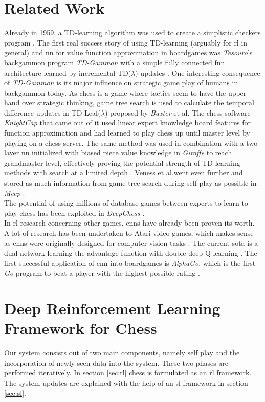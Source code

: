 \documentclass[twocolumn]{phdsymp} %
\begin{document}
\section{Related Work}
\label{sec:relwork}
Already in 1959, a TD-learning algorithm was used to create a simplistic checkers program \cite{samuel}. The first real success story of using TD-learning (arguably for \gls{rl} in general) and \Gls{nn} for value function approximation in boardgames was \textit{Tesouro}'s backgammon program \textit{TD-Gammon} with a simple fully connected \gls{fnn} architecture learned by incremental TD($\lambda$) updates \cite{tesauro}. One interesting consequence of \textit{TD-Gammon} is its major influence on strategic game play of humans in backgammon today. As chess is a game where tactics seem to have the upper hand over strategic thinking, game tree search is used to calculate the temporal difference updates in TD-Leaf($\lambda$) proposed by \textit{Baxter} et al. The chess software \textit{KnightCap} that came out of it used linear expert knowledge board features for function approximation and had learned to play chess up until master level by playing on a chess server. The same method was used in combination with a two layer \gls{nn} initialized with biased piece value knowledge in \textit{Giraffe} to reach grandmaster level, effectively proving the potential strength of TD-learning methods with search at a limited depth \cite{giraffe}.  Veness et al.went even further and stored as much information from game tree search during self play as possible in \textit{Meep} \cite{meep}.\\
The potential of using millions of database games between experts to learn to play chess has been exploited in \textit{DeepChess} \cite{deepchess}.\\

In \gls{rl} research concerning other games, \glspl{cnn} have already been proven its worth. A lot of research has been undertaken to Atari video games, which makes sense as \glspl{cnn} were originally designed for computer vision tasks \cite{atari}. The current \gls{sota} is a dual network learning the advantage function with double deep Q-learning \cite{dddqn}. The first successful application of \Gls{cnn} into boardgames is \textit{AlphaGo}, which is the first \textit{Go} program to beat a player with the highest possible rating \cite{alphago}.   

\section{Deep Reinforcement Learning Framework for Chess}
\label{sec:drl}
Our system consists out of two main components, namely self play and the incorporation of newly seen data into the system. These two phases are performed iteratively. In section \ref{sec:rl} chess is formulated as an \gls{rl} framework. The system updates are explained with the help of an \gls{sl} framework in section \ref{sec:sl}.
\end{document}
